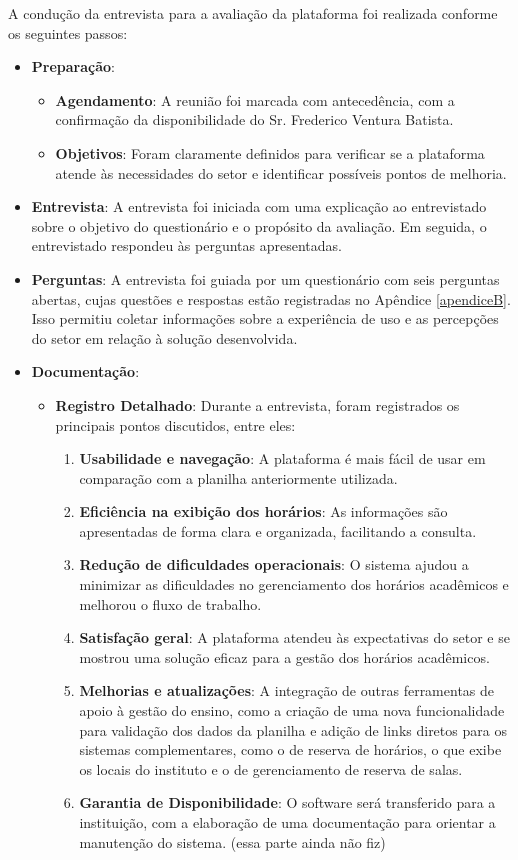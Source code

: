 A condução da entrevista para a avaliação da plataforma foi realizada conforme os seguintes passos:
\begin{itemize}
    \item \textbf{Preparação}:
    \begin{itemize}
        \item \textbf{Agendamento}: A reunião foi marcada com antecedência, com a confirmação da disponibilidade do Sr. Frederico Ventura Batista.
        \item \textbf{Objetivos}: Foram claramente definidos para verificar se a plataforma atende às necessidades do setor e identificar possíveis pontos de melhoria.
    \end{itemize}
    \item \textbf{Entrevista}: A entrevista foi iniciada com uma explicação ao entrevistado sobre o objetivo do questionário e o propósito da avaliação. Em seguida, o entrevistado respondeu às perguntas apresentadas.
    \item \textbf{Perguntas}: A entrevista foi guiada por um questionário com seis perguntas abertas, cujas questões e respostas estão registradas no Apêndice \ref{apendiceB}. Isso permitiu coletar informações sobre a experiência de uso e as percepções do setor em relação à solução desenvolvida.
    \item \textbf{Documentação}:
    \begin{itemize}
        \item \textbf{Registro Detalhado}: Durante a entrevista, foram registrados os principais pontos discutidos, entre eles:
        \begin{enumerate}
            \item \textbf{Usabilidade e navegação}: A plataforma é mais fácil de usar em comparação com a planilha anteriormente utilizada.
            \item \textbf{Eficiência na exibição dos horários}: As informações são apresentadas de forma clara e organizada, facilitando a consulta.
            \item \textbf{Redução de dificuldades operacionais}: O sistema ajudou a minimizar as dificuldades no gerenciamento dos horários acadêmicos e melhorou o fluxo de trabalho.
            \item \textbf{Satisfação geral}: A plataforma atendeu às expectativas do setor e se mostrou uma solução eficaz para a gestão dos horários acadêmicos.
            \item \textbf{Melhorias e atualizações}: A integração de outras ferramentas de apoio à gestão do ensino, como a criação de uma nova funcionalidade para validação dos dados da planilha e adição de links diretos para os sistemas complementares, como o de reserva de horários, o que exibe os locais do instituto e o de gerenciamento de reserva de salas.
            \item \textbf{Garantia de Disponibilidade}: O software será transferido para a instituição, com a elaboração de uma documentação para orientar a manutenção do sistema. (essa parte ainda não fiz)
        \end{enumerate}
    \end{itemize}
\end{itemize}

